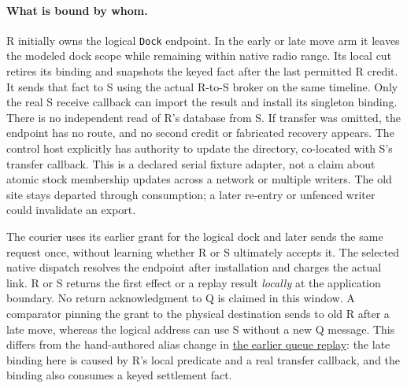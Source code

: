 \documentclass{article}
\begin{document}
\paragraph{What is bound by whom.}
R initially owns the logical \texttt{Dock} endpoint. In the early
or late move arm it leaves the modeled dock scope while remaining
within native radio range. Its local cut retires its binding
and snapshots the keyed fact after the last permitted R credit.
It sends that fact to S using the actual R-to-S broker on the same
timeline. Only the real S receive callback can import the result
and install its singleton binding. There is no independent read
of R's database from S. If transfer was omitted, the endpoint
has no route, and no second credit or fabricated recovery appears.
The control host explicitly has authority to update the directory,
co-located with S's transfer callback. This is a declared serial
fixture adapter, not a claim about atomic stock membership
updates across a network or multiple writers. The old
site stays departed through consumption; a later re-entry or
unfenced writer could invalidate an export.

The courier uses its earlier grant for the logical dock and
later sends the same request once, without learning whether
R or S ultimately accepts it. The selected native dispatch resolves
the endpoint after installation and charges the actual link.
R or S returns the first effect or a replay result \emph{locally}
at the application boundary. No return acknowledgment to Q
is claimed in this window. A comparator pinning the grant to
the physical destination sends to old R after a late move,
whereas the logical address can use S without a new Q message.
This differs from the hand-authored alias change in
\href{https://github.com/eternal-november/eos-research-programmes/pull/624}{the earlier queue replay}:
the late binding here is caused by R's local predicate and a
real transfer callback, and the binding also consumes a keyed
settlement fact.
\end{document}
